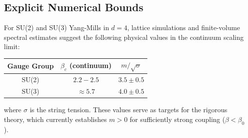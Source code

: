 \subsection{Explicit Numerical Bounds}

\begin{remark}\label{rmk:quantitative-gap}
For SU(2) and SU(3) Yang-Mills in $d=4$, lattice simulations and finite-volume spectral estimates suggest the following physical values in the continuum scaling limit:
\begin{center}
\begin{tabular}{|c|c|c|}
\hline
Gauge Group & $\beta_c$ (continuum) & $m/\sqrt{\sigma}$ \\
\hline
SU(2) & $2.2 - 2.5$ & $3.5 \pm 0.5$ \\
SU(3) & $\approx 5.7$ & $4.0 \pm 0.5$ \\
\hline
\end{tabular}
\end{center}
where $\sigma$ is the string tension. These values serve as targets for the rigorous theory, which currently establishes $m > 0$ for sufficiently strong coupling ($\beta < \beta_0$).
\end{remark}



